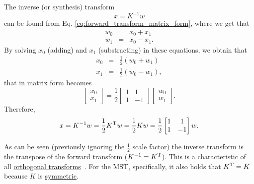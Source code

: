 The inverse (or synthesis) transform
\begin{equation}
  x = K^{-1}w
  \label{eq:inverse_transform}
\end{equation}
can be found from Eq. \ref{eq:forward_transform_matrix_form}, where we
get that
\begin{equation}
  \begin{array}{rcl}
  w_0 & = & x_0 + x_1\\
  w_1 & = & x_0 - x_1.
  \end{array}
\end{equation}
By solving $x_0$ (adding) and $x_1$ (substracting) in
these equations, we obtain that
\begin{equation}
  \begin{array}{rcl}
  x_0 & = & \frac{1}{2}(w_0 + w_1)\\
  x_1 & = & \frac{1}{2}(w_0 - w_1),
  \end{array}
\end{equation}
that in matrix form becomes
\begin{equation}
  \begin{bmatrix}
    x_0 \\
    x_1
  \end{bmatrix}
  = \frac{1}{2}
  \begin{bmatrix} 1 & 1 \\ 1 & -1 \end{bmatrix}
  \begin{bmatrix}
    w_0 \\
    w_1
  \end{bmatrix}.
\end{equation}
Therefore,
\begin{equation}
  x = K^{-1}w = \frac{1}{2}K^{\text T}w = \frac{1}{2}Kw = \frac{1}{2}\begin{bmatrix} 1 & 1 \\ 1 & -1 \end{bmatrix}w.
  \label{eq:inverse_transform_matrix_form}
\end{equation}

As can be seen (previously ignoring the $\frac{1}{2}$ scale factor)
the inverse transform is the transpose of the forward transform
($K^{-1}=K^{\text T}$). This is a characteristic of all
\href{https://en.wikipedia.org/wiki/Orthogonal_transformation}{orthogonal
  transforms}~\cite{sayood2017introduction}. For the MST,
specifically, it also holds that $K^{\text T}=K$ because $K$ is
\href{https://en.wikipedia.org/wiki/Symmetric_matrix}{symmetric}.

